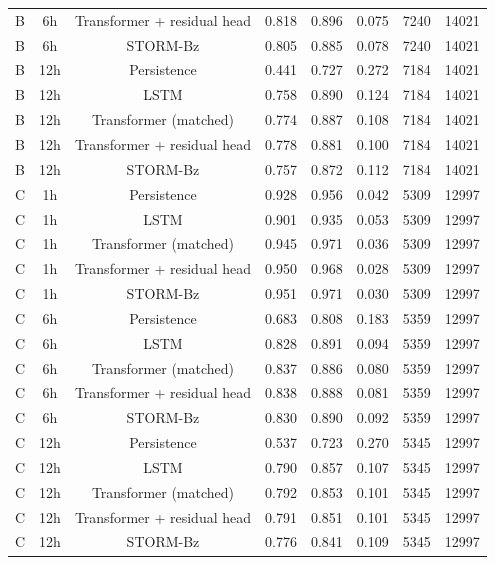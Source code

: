 \begin{tabular}{lccccccc}
B & 6h & Transformer + residual head & 0.818 & 0.896 & 0.075 & 7240 & 14021 \\
B & 6h & STORM-Bz & 0.805 & 0.885 & 0.078 & 7240 & 14021 \\
B & 12h & Persistence & 0.441 & 0.727 & 0.272 & 7184 & 14021 \\
B & 12h & LSTM & 0.758 & 0.890 & 0.124 & 7184 & 14021 \\
B & 12h & Transformer (matched) & 0.774 & 0.887 & 0.108 & 7184 & 14021 \\
B & 12h & Transformer + residual head & 0.778 & 0.881 & 0.100 & 7184 & 14021 \\
B & 12h & STORM-Bz & 0.757 & 0.872 & 0.112 & 7184 & 14021 \\
C & 1h & Persistence & 0.928 & 0.956 & 0.042 & 5309 & 12997 \\
C & 1h & LSTM & 0.901 & 0.935 & 0.053 & 5309 & 12997 \\
C & 1h & Transformer (matched) & 0.945 & 0.971 & 0.036 & 5309 & 12997 \\
C & 1h & Transformer + residual head & 0.950 & 0.968 & 0.028 & 5309 & 12997 \\
C & 1h & STORM-Bz & 0.951 & 0.971 & 0.030 & 5309 & 12997 \\
C & 6h & Persistence & 0.683 & 0.808 & 0.183 & 5359 & 12997 \\
C & 6h & LSTM & 0.828 & 0.891 & 0.094 & 5359 & 12997 \\
C & 6h & Transformer (matched) & 0.837 & 0.886 & 0.080 & 5359 & 12997 \\
C & 6h & Transformer + residual head & 0.838 & 0.888 & 0.081 & 5359 & 12997 \\
C & 6h & STORM-Bz & 0.830 & 0.890 & 0.092 & 5359 & 12997 \\
C & 12h & Persistence & 0.537 & 0.723 & 0.270 & 5345 & 12997 \\
C & 12h & LSTM & 0.790 & 0.857 & 0.107 & 5345 & 12997 \\
C & 12h & Transformer (matched) & 0.792 & 0.853 & 0.101 & 5345 & 12997 \\
C & 12h & Transformer + residual head & 0.791 & 0.851 & 0.101 & 5345 & 12997 \\
C & 12h & STORM-Bz & 0.776 & 0.841 & 0.109 & 5345 & 12997 \\
\bottomrule
\end{tabular}
